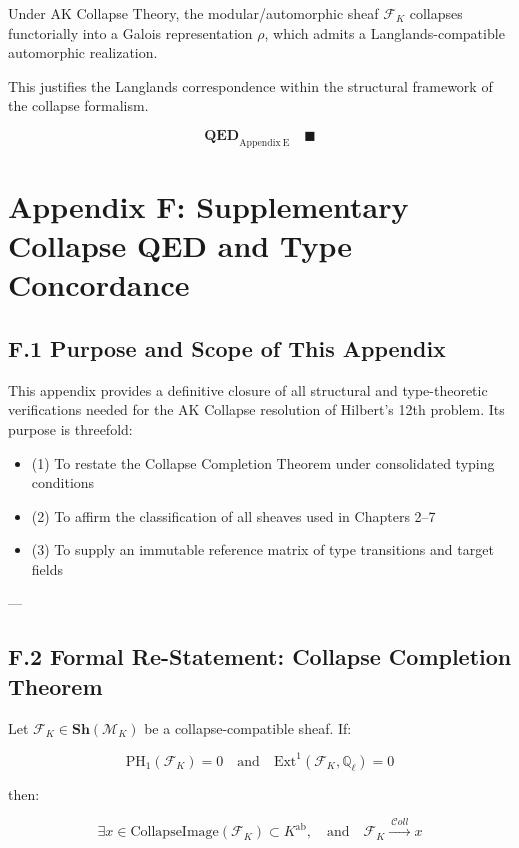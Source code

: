 \documentclass[11pt]{article}
\begin{document}
Under AK Collapse Theory, the modular/automorphic sheaf \( \mathcal{F}_K \) collapses functorially into a Galois representation \( \rho \), which admits a Langlands-compatible automorphic realization.

This justifies the Langlands correspondence within the structural framework of the collapse formalism.

\[
\textbf{QED}_{\mathrm{Appendix\ E}} \quad \blacksquare
\]



\appendix
\section*{Appendix F: Supplementary Collapse QED and Type Concordance}

\subsection*{F.1 Purpose and Scope of This Appendix}

This appendix provides a definitive closure of all structural and type-theoretic verifications needed for the AK Collapse resolution of Hilbert’s 12th problem.  
Its purpose is threefold:
\begin{itemize}
    \item (1) To restate the Collapse Completion Theorem under consolidated typing conditions
    \item (2) To affirm the classification of all sheaves used in Chapters 2–7
    \item (3) To supply an immutable reference matrix of type transitions and target fields
\end{itemize}

---

\subsection*{F.2 Formal Re-Statement: Collapse Completion Theorem}

Let \( \mathcal{F}_K \in \mathbf{Sh}(\mathcal{M}_K) \) be a collapse-compatible sheaf.  
If:

\[
\mathrm{PH}_1(\mathcal{F}_K) = 0 \quad \text{and} \quad \mathrm{Ext}^1(\mathcal{F}_K, \mathbb{Q}_\ell) = 0
\]

then:

\[
\exists x \in \text{CollapseImage}(\mathcal{F}_K) \subset K^{\mathrm{ab}}, \quad \text{and} \quad \mathcal{F}_K \xrightarrow{\ \mathcal{C}oll\ } x
\]
\end{document}
